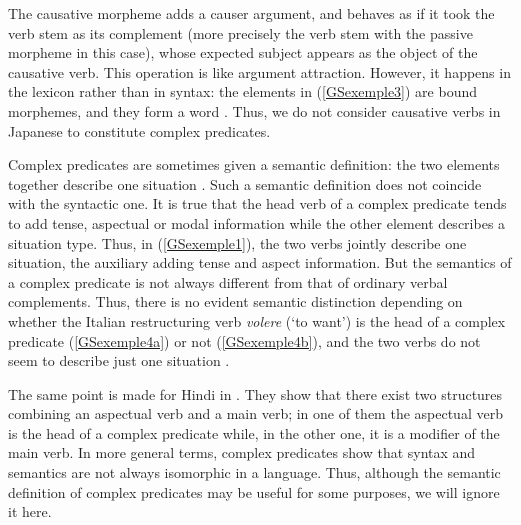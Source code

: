 \documentclass[output=paper
                ,modfonts
                ,nonflat
	        ,collection
	        ,collectionchapter
	        ,collectiontoclongg
 	        ,biblatex
                ,babelshorthands
                ,newtxmath
                ,draftmode
                ,colorlinks, citecolor=brown
]{./langsci/langscibook}
\begin{document}
{
\z

The causative morpheme adds a causer argument, and behaves as if it took the verb stem as its complement (more precisely the verb stem with the passive morpheme in this case), whose expected subject appears as the object of the causative verb. This operation is like argument attraction. However, it happens in the lexicon rather than in syntax: the elements in (\ref{GSexemple3}) are bound morphemes, and they form a word \citep{manning1999lexical, gunji2012topics}. Thus, we do not consider causative verbs in Japanese to constitute complex predicates.

Complex predicates are sometimes given a semantic definition: the two elements together describe one situation \citep{butt1995structure}. Such a semantic definition does not coincide with the syntactic one. It is true that the head verb of a complex predicate tends to add tense, aspectual or modal information while the other element describes a situation type. Thus, in (\ref{GSexemple1}), the two verbs jointly describe one situation, the auxiliary adding tense and aspect information. But the semantics of a complex predicate is not always different from that of ordinary verbal complements. Thus, there is no evident semantic distinction depending on whether the Italian restructuring verb \emph{volere} (`to want') is the head of a complex predicate (\ref{GSexemple4a}) or not (\ref{GSexemple4b}), and the two verbs do not seem to describe just one situation \citep{Monachesi98a}.  

\eal 
	\label{GSexemple4} 
	\label{GSexemple4a}
		
	\label{GSexemple4b} 
\zl

The same point is made for Hindi in \cite{poornima2009hindi}. They show that there exist two structures combining an aspectual verb and a main verb; in one of them the aspectual verb is the head of a complex predicate while, in the other one, it is a modifier of the main verb. In more general terms, complex predicates show that syntax and semantics are not always isomorphic in a language. Thus, although the semantic definition of complex predicates may be useful for some purposes, we will ignore it here.

}
\end{document}
